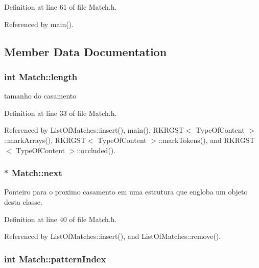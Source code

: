 Definition at line 61 of file Match.\+h.



Referenced by main().



\subsection{Member Data Documentation}
\hypertarget{classMatch_aa7e6b74eb7831de7a921ef7d3655d19a}{
\subsubsection[{length}]{\setlength{\rightskip}{0pt plus 5cm}int Match\+::length}}\label{classMatch_aa7e6b74eb7831de7a921ef7d3655d19a}


tamanho do casamento 



Definition at line 33 of file Match.\+h.



Referenced by List\+Of\+Matches\+::insert(), main(), R\+K\+R\+G\+S\+T$<$ Type\+Of\+Content $>$\+::mark\+Arrays(), R\+K\+R\+G\+S\+T$<$ Type\+Of\+Content $>$\+::mark\+Tokens(), and R\+K\+R\+G\+S\+T$<$ Type\+Of\+Content $>$\+::occluded().

\hypertarget{classMatch_a992c150265becb5f6806d09bad8cea0c}{
\subsubsection[{next}]{$\ast$ Match\+::next}}\label{classMatch_a992c150265becb5f6806d09bad8cea0c}


Ponteiro para o proximo casamento em uma estrutura que engloba um objeto desta classe. 



Definition at line 40 of file Match.\+h.



Referenced by List\+Of\+Matches\+::insert(), and List\+Of\+Matches\+::remove().

\hypertarget{classMatch_ac673bad1075e5499f0d857ed0a526fa2}{
\subsubsection[{pattern\+Index}]{\setlength{\rightskip}{0pt plus 5cm}int Match\+::pattern\+Index}}\label{classMatch_ac673bad1075e5499f0d857ed0a526fa2}


